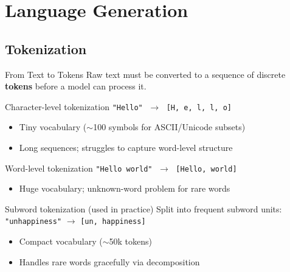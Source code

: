 
\section{Language Generation}

\subsection{Tokenization}

\begin{frame}{From Text to Tokens}
  Raw text must be converted to a sequence of discrete \textbf{tokens} before a model can process it.

  \begin{block}{Character-level tokenization}
    \texttt{"Hello"} $\;\to\;$ \texttt{[H, e, l, l, o]}
    \begin{itemize}
      \item Tiny vocabulary ($\sim$100 symbols for ASCII/Unicode subsets)
      \item Long sequences; struggles to capture word-level structure
    \end{itemize}
  \end{block}

  \begin{block}{Word-level tokenization}
    \texttt{"Hello world"} $\;\to\;$ \texttt{[Hello, world]}
    \begin{itemize}
      \item Huge vocabulary; unknown-word problem for rare words
    \end{itemize}
  \end{block}

  \begin{alertblock}{Subword tokenization (used in practice)}
    Split into frequent subword units: \texttt{"unhappiness"} $\to$ \texttt{[un, happiness]}
    \begin{itemize}
      \item Compact vocabulary ($\sim$50k tokens)
      \item Handles rare words gracefully via decomposition
    \end{itemize}
  \end{alertblock}
\end{frame}

